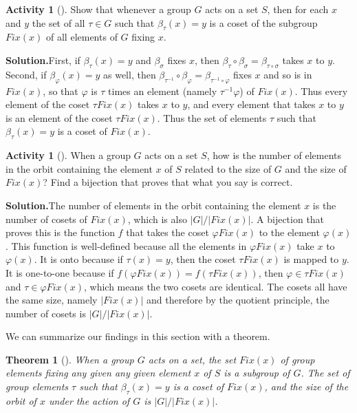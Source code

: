\documentclass[10pt,]{book}
\theoremstyle{plain}
\newtheorem{theorem}{Theorem}[section]
\theoremstyle{definition}
\newtheorem{activity}[project]{Activity}
\numberwithin{equation}{chapter}
\begin{document}
\begin{activity}[]\label{activity-301}
Show that whenever a group \(G\) acts on a set \(S\), then for each \(x\) and \(y\) the set of all \(\tau \in G\) such that \(\beta_{\tau}(x) = y\) is a coset of the subgroup \({ Fix}(x)\) of all elements of \(G\) fixing \(x\).%
\par\medskip\noindent%
\textbf{Solution.}\quad First, if \(\beta_{\tau}(x)=y\) and \(\beta_{\sigma}\) fixes \(x\), then \(\beta_{\tau}\circ \beta_{\sigma}=\beta_{\tau\circ\sigma}\) takes \(x\) to \(y\). Second, if \(\beta_{\varphi}(x)=y\) as well, then \(\beta_{\tau^{-1}}\circ\beta_{\varphi}=\beta_{\tau^{-1}\circ\varphi}\) fixes \(x\) and so is in \({ Fix}(x)\), so that \(\varphi\) is \(\tau\) times an element (namely \(\tau^{-1}\varphi\)) of \({ Fix}(x)\). Thus every element of the coset \(\tau{ Fix}(x)\) takes \(x\) to \(y\), and every element that takes \(x\) to \(y\) is an element of the coset \(\tau{
Fix}(x)\). Thus the set of elements \(\tau\) such that \(\beta_{\tau}(x)=y\) is a coset of \({ Fix}(x)\).%
\end{activity}
\begin{activity}[]\label{activity-302}
When a group \(G\) acts on a set \(S\), how is the number of elements in the orbit containing the element \(x\) of \(S\) related to the size of \(G\) and the size of \({ Fix}(x)\)? Find a bijection that proves that what you say is correct.%
\par\medskip\noindent%
\textbf{Solution.}\quad The number of elements in the orbit containing the element \(x\) is the number of cosets of \({ Fix}(x)\), which is also \(|G|/|{ Fix}(x)|\). A bijection that proves this is the function \(f\) that takes the coset \(\varphi{ Fix}(x)\) to the element \(\varphi(x)\). This function is well-defined because all the elements in \(\varphi{
Fix}(x)\) take \(x\) to \(\varphi(x)\). It is onto because if \(\tau(x) =y\), then the coset \(\tau{ Fix}(x)\) is mapped to \(y\). It is one-to-one because if \(f(\varphi{ Fix}(x))=f(\tau{ Fix}(x))\), then \(\varphi\in \tau{ Fix}(x)\) and \(\tau \in \varphi{ Fix}(x)\), which means the two cosets are identical. The cosets all have the same size, namely \(|{ Fix}(x)|\) and therefore by the quotient principle, the number of cosets is \(|G|/|{ Fix}(x)|\).%
\end{activity}
We can summarize our findings in this section with a theorem.%
\begin{theorem}[{}]\label{theorem-8}
When a group \(G\) acts on a set, the set \({ Fix}(x)\) of group elements fixing any given any given element \(x\) of \(S\) is a subgroup of \(G\). The set of group elements \(\tau\) such that \(\beta_{\tau}(x) = y\) is a coset of \({ Fix}(x)\), and the size of the orbit of \(x\) under the action of \(G\) is \(|G|/|{ Fix}(x)|\).%
\end{theorem}
\typeout{************************************************}
\typeout{************************************************}
\end{document}

